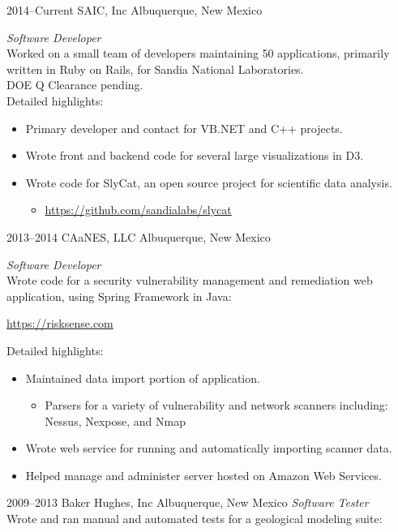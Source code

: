 \documentclass[]{friggeri-cv} %
\begin{document}
\begin{entrylist}
\entry
{2014--Current}
{SAIC, Inc}
{Albuquerque, New Mexico}
{\emph{Software Developer} \\
Worked on a small team of developers maintaining 50 applications, primarily written in Ruby on Rails, for Sandia National Laboratories.\\
DOE Q Clearance pending. \\
Detailed highlights:
\begin{itemize}
\item Primary developer and contact for VB.NET and C++ projects.
\item Wrote front and backend code for several large visualizations in D3.
\item Wrote code for SlyCat, an open source project for scientific data analysis.
\begin{itemize}
		\item \href{https://github.com/sandialabs/slycat}{https://github.com/sandialabs/slycat}
\end{itemize}
\end{itemize}
}
\entry
{2013--2014}
{CAaNES, LLC}
{Albuquerque, New Mexico}
{\emph{Software Developer} \\
Wrote code for a security vulnerability management and remediation web application, using Spring Framework in Java:
\begin{center}
	\href{https://risksense.com}{https://risksense.com}
\end{center}
Detailed highlights:
\begin{itemize}
\item Maintained data import portion of application.
\begin{itemize}
	\item Parsers for a variety of vulnerability and network scanners including: Nessus, Nexpose, and Nmap
\end{itemize}
\item Wrote web service for running and automatically importing scanner data.
\item Helped manage and administer server hosted on Amazon Web Services.
\end{itemize}}
\entry
{2009--2013}
{Baker Hughes, Inc}
{Albuquerque, New Mexico}
{\emph{Software Tester} \\
Wrote and ran manual and automated tests for a geological modeling suite:
}
\end{entrylist}
\end{document}
